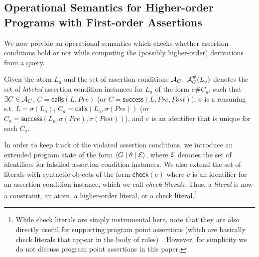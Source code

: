 \documentclass{llncs}
\newcommand{\AC}
  {\ensuremath{{\cal A}_{C}}}
\newcommand{\LabAClit}[1]
  {\ensuremath{\AC^{\#}(#1)}}
\newcommand{\gd}[0]{\mid}
\newcommand{\exstate}[3]
  {\ensuremath{\langle #1 \gd{} #2 \gd{} #3 \rangle}}
\newcommand{\ADeps}{\ensuremath{{\cal E}}}
\newcommand{\asrId}[1]{\ensuremath{c_{#1}}}
\newcommand{\checkLitLab}[1]{\ensuremath{\textsf{check}(#1)}}
\newcommand{\callsAsr}[2]{\ensuremath{\textsf{calls}(#1, #2)}}
\newcommand{\successAsr}[3]{\ensuremath{\textsf{success}(#1, #2, #3)}}
\begin{document}
\subsection{Operational Semantics for Higher-order Programs with
  First-order Assertions}
\label{sec:Run-Time-Checking}
We now provide an operational semantics which checks whether
assertion conditions hold or not while computing the (possibly
higher-order) derivations from a query.

\begin{definition}
  \label{def:assrt-cond-lab-inst}
  Given the atom $L_a$ and the set of assertion conditions $\AC$,
  $\LabAClit{L_a}$ denotes the set of \emph{labeled} assertion condition
  instances for $L_a$ of the form $\asrId{}\#C_a$, such that
$\exists C \in \AC$,
$C = \callsAsr{L}{Pre}$
  (or $C = \successAsr{L}{Pre}{Post}$),
$\sigma$ is a renaming s.t. $L = \sigma(L_a)$,
$C_a = \callsAsr{L_a}{\sigma(Pre)}$
  (or $C_a = \successAsr{L_a}{\sigma(Pre)}{\sigma(Post)}$),
and $\asrId{}$ is an identifier that is unique for each $C_a$.
\end{definition}

In order to keep track of the violated assertion conditions, we
introduce an extended program state of the form
\exstate{G}{\theta}{\ADeps}, where $\ADeps$ denotes the set of
identifiers for falsified assertion condition instances.
We also extend the set of literals with syntactic objects of the form
$\checkLitLab{\asrId{}}$ where 
$\asrId{}$ is an identifier for an assertion condition instance,
which we call \emph{check literals}.
Thus, a \emph{literal} is now a constraint, an atom, a higher-order
literal, or a check literal.\footnote{While check literals are simply
  instrumental here, note that they are also directly useful for
  supporting program point assertions (which are basically check
  literals that appear in the body of
  rules)~\cite{assert-lang-disciplbook-short}. However, for simplicity
  we do not discuss program point assertions in this paper.}
\end{document}
